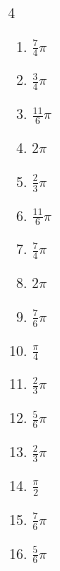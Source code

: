 \begin{multicols}{4}
\begin{enumerate}
  \item $\displaystyle \frac{7}{4}\pi$

  \item $\displaystyle \frac{3}{4}\pi$

  \item $\displaystyle \frac{11}{6}\pi$

  \item $\displaystyle 2\pi$

  \item $\displaystyle \frac{2}{3}\pi$

\columnbreak %

  \item $\displaystyle \frac{11}{6}\pi$

  \item $\displaystyle \frac{7}{4}\pi$

  \item $\displaystyle 2\pi$

  \item $\displaystyle \frac{7}{6}\pi$

  \item $\displaystyle \frac{\pi}{4}$

  \item $\displaystyle \frac{2}{3}\pi$

  \item $\displaystyle \frac{5}{6}\pi$

  \item $\displaystyle \frac{2}{3}\pi$

  \item $\displaystyle \frac{\pi}{2}$

  \item $\displaystyle \frac{7}{6}\pi$

  \item $\displaystyle \frac{5}{6}\pi$


\end{enumerate}
\end{multicols}
